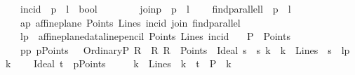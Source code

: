 \begin{isabellebody}
\ \ \ incid\ {\isacharcolon}{\kern0pt}{\isacharcolon}{\kern0pt}\ {\isachardoublequoteopen}{\isacharprime}{\kern0pt}p\ {\isasymRightarrow}\ {\isacharprime}{\kern0pt}l\ {\isasymRightarrow}\ bool{\isachardoublequoteclose}\ \ {\isacharparenleft}{\kern0pt}\ {\isachardoublequoteopen}{\isasymlhd}{\isachardoublequoteclose}\ {}{}{\isacharparenright}{\kern0pt}\ \isanewline
\ \ \ join{\isacharcolon}{\kern0pt}{\isacharcolon}{\kern0pt}{\isachardoublequoteopen}{\isacharprime}{\kern0pt}p\ {\isasymRightarrow}\ {\isacharprime}{\kern0pt}p\ {\isasymRightarrow}\ {\isacharprime}{\kern0pt}l{\isachardoublequoteclose}\ \isanewline
\ \ \ find{\isacharunderscore}{\kern0pt}parallel{\isacharcolon}{\kern0pt}{\isacharcolon}{\kern0pt}{\isachardoublequoteopen}{\isacharprime}{\kern0pt}l\ {\isasymRightarrow}\ {\isacharprime}{\kern0pt}p\ {\isasymRightarrow}\ {\isacharprime}{\kern0pt}l{\isachardoublequoteclose}\isanewline
\ \ \ ap{\isacharcolon}{\kern0pt}\ {\isachardoublequoteopen}affine{\isacharunderscore}{\kern0pt}plane\ Points\ Lines\ incid\ join\ find{\isacharunderscore}{\kern0pt}parallel{\isachardoublequoteclose}\isanewline
\ \ \ {\isachardoublequoteopen}lp\ {\isasymequiv}\ affine{\isacharunderscore}{\kern0pt}plane{\isacharunderscore}{\kern0pt}data{\isachardot}{\kern0pt}line{\isacharunderscore}{\kern0pt}pencil\ Points\ Lines\ incid{\isachardoublequoteclose}\isanewline
\ \ \ {\isachardoublequoteopen}P\ {\isasymin}\ Points{\isachardoublequoteclose}\isanewline
\ \ \ pp{\isacharcolon}{\kern0pt}\ {\isachardoublequoteopen}pPoints\ {\isasymequiv}\ \ {\isacharbraceleft}{\kern0pt}OrdinaryP\ R\ {\isacharbar}{\kern0pt}\ R{\isachardot}{\kern0pt}\ {\isacharparenleft}{\kern0pt}R\ {\isasymin}\ Points{\isacharparenright}{\kern0pt}{\isacharbraceright}{\kern0pt}\ {\isasymunion}\ {\isacharbraceleft}{\kern0pt}Ideal\ s\ {\isacharbar}{\kern0pt}\ s\ k\ {\isachardot}{\kern0pt}\ {\isacharparenleft}{\kern0pt}k\ {\isasymin}\ Lines{\isacharparenright}{\kern0pt}\ {\isasymand}\ s\ {\isacharequal}{\kern0pt}\ lp\ k{\isacharbraceright}{\kern0pt}{\isachardoublequoteclose}\ \isanewline
\ \ \ {\isachardoublequoteopen}Ideal\ t\ {\isasymin}\ pPoints{\isachardoublequoteclose}\ \isanewline
\ \ \ {\isachardoublequoteopen}{\isasymexists}{\isacharbang}{\kern0pt}\ k\ {\isasymin}\ Lines\ {\isachardot}{\kern0pt}\ k\ {\isasymin}\ t\ {\isasymand}\ P\ {\isasymlhd}\ k{\isachardoublequoteclose}\isanewline

\end{isabellebody}
